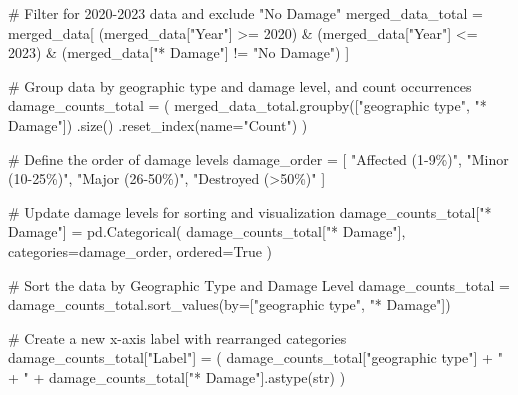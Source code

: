 \documentclass[
  letterpaper,
  DIV=11,
  numbers=noendperiod]{scrartcl}
\newenvironment{Shaded}{\begin{snugshade}}{\end{snugshade}}
\newcommand{\BuiltInTok}[1]{\textcolor[rgb]{0.00,0.23,0.31}{#1}}
\newcommand{\CommentTok}[1]{\textcolor[rgb]{0.37,0.37,0.37}{#1}}
\newcommand{\DecValTok}[1]{\textcolor[rgb]{0.68,0.00,0.00}{#1}}
\newcommand{\NormalTok}[1]{\textcolor[rgb]{0.00,0.23,0.31}{#1}}
\newcommand{\OperatorTok}[1]{\textcolor[rgb]{0.37,0.37,0.37}{#1}}
\newcommand{\StringTok}[1]{\textcolor[rgb]{0.13,0.47,0.30}{#1}}
\newcommand{\VariableTok}[1]{\textcolor[rgb]{0.07,0.07,0.07}{#1}}
\begin{document}
\begin{Shaded}
\begin{Highlighting}[]
\CommentTok{\# Filter for 2020{-}2023 data and exclude "No Damage"}
\NormalTok{merged\_data\_total }\OperatorTok{=}\NormalTok{ merged\_data[}
\NormalTok{    (merged\_data[}\StringTok{"Year"}\NormalTok{] }\OperatorTok{\textgreater{}=} \DecValTok{2020}\NormalTok{) }\OperatorTok{\&} 
\NormalTok{    (merged\_data[}\StringTok{"Year"}\NormalTok{] }\OperatorTok{\textless{}=} \DecValTok{2023}\NormalTok{) }\OperatorTok{\&}
\NormalTok{    (merged\_data[}\StringTok{"* Damage"}\NormalTok{] }\OperatorTok{!=} \StringTok{"No Damage"}\NormalTok{)}
\NormalTok{]}

\CommentTok{\# Group data by geographic type and damage level, and count occurrences}
\NormalTok{damage\_counts\_total }\OperatorTok{=}\NormalTok{ (}
\NormalTok{    merged\_data\_total.groupby([}\StringTok{"geographic type"}\NormalTok{, }\StringTok{"* Damage"}\NormalTok{])}
\NormalTok{    .size()}
\NormalTok{    .reset\_index(name}\OperatorTok{=}\StringTok{"Count"}\NormalTok{)}
\NormalTok{)}

\CommentTok{\# Define the order of damage levels}
\NormalTok{damage\_order }\OperatorTok{=}\NormalTok{ [}
    \StringTok{"Affected (1{-}9\%)"}\NormalTok{, }
    \StringTok{"Minor (10{-}25\%)"}\NormalTok{, }
    \StringTok{"Major (26{-}50\%)"}\NormalTok{, }
    \StringTok{"Destroyed (\textgreater{}50\%)"}
\NormalTok{]}

\CommentTok{\# Update damage levels for sorting and visualization}
\NormalTok{damage\_counts\_total[}\StringTok{"* Damage"}\NormalTok{] }\OperatorTok{=}\NormalTok{ pd.Categorical(}
\NormalTok{    damage\_counts\_total[}\StringTok{"* Damage"}\NormalTok{], categories}\OperatorTok{=}\NormalTok{damage\_order, ordered}\OperatorTok{=}\VariableTok{True}
\NormalTok{)}

\CommentTok{\# Sort the data by Geographic Type and Damage Level}
\NormalTok{damage\_counts\_total }\OperatorTok{=}\NormalTok{ damage\_counts\_total.sort\_values(by}\OperatorTok{=}\NormalTok{[}\StringTok{"geographic type"}\NormalTok{, }\StringTok{"* Damage"}\NormalTok{])}

\CommentTok{\# Create a new x{-}axis label with rearranged categories}
\NormalTok{damage\_counts\_total[}\StringTok{"Label"}\NormalTok{] }\OperatorTok{=}\NormalTok{ (}
\NormalTok{    damage\_counts\_total[}\StringTok{"geographic type"}\NormalTok{] }\OperatorTok{+} \StringTok{" + "} \OperatorTok{+}\NormalTok{ damage\_counts\_total[}\StringTok{"* Damage"}\NormalTok{].astype(}\BuiltInTok{str}\NormalTok{)}
\NormalTok{)}


\end{Highlighting}
\end{Shaded}
\end{document}
